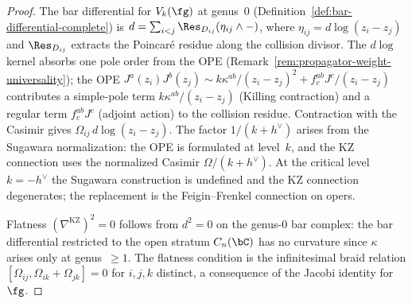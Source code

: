 \begin{proof}
The bar differential for $V_k(\fg)$ at genus~$0$
(Definition~\ref{def:bar-differential-complete}) is
$d = \sum_{i<j} \Res_{D_{ij}} (\eta_{ij} \wedge -)$, where
$\eta_{ij} = d\log(z_i-z_j)$ and $\Res_{D_{ij}}$ extracts the Poincar\'e
residue along the collision divisor. The $d\log$ kernel absorbs one pole order
from the OPE (Remark~\ref{rem:propagator-weight-universality}); the OPE
$J^a(z_i) J^b(z_j) \sim k\kappa^{ab}/(z_i-z_j)^2 + f^{ab}_c J^c/(z_i-z_j)$
contributes a simple-pole term $k\kappa^{ab}/(z_i-z_j)$ (Killing contraction)
and a regular term $f^{ab}_c J^c$ (adjoint action) to the collision residue.
Contraction with the Casimir gives $\Omega_{ij}\,d\log(z_i-z_j)$. The factor
$1/(k+h^\vee)$ arises from the Sugawara normalization: the OPE is formulated
at level~$k$, and the KZ connection uses the normalized Casimir
$\Omega/(k+h^\vee)$. At the critical level $k = -h^\vee$ the Sugawara
construction is undefined and the KZ connection degenerates; the replacement
is the Feigin--Frenkel connection on opers.

Flatness $(\nabla^{\mathrm{KZ}})^2 = 0$ follows from $d^2 = 0$ on the genus-$0$
bar complex: the bar differential restricted to the open stratum $C_n(\bC)$
has no curvature since $\kappa$ arises only at genus~$\geq 1$. The flatness
condition is the infinitesimal braid relation
$[\Omega_{ij}, \Omega_{ik} + \Omega_{jk}] = 0$ for $i,j,k$ distinct, a
consequence of the Jacobi identity for~$\fg$.
\end{proof}

